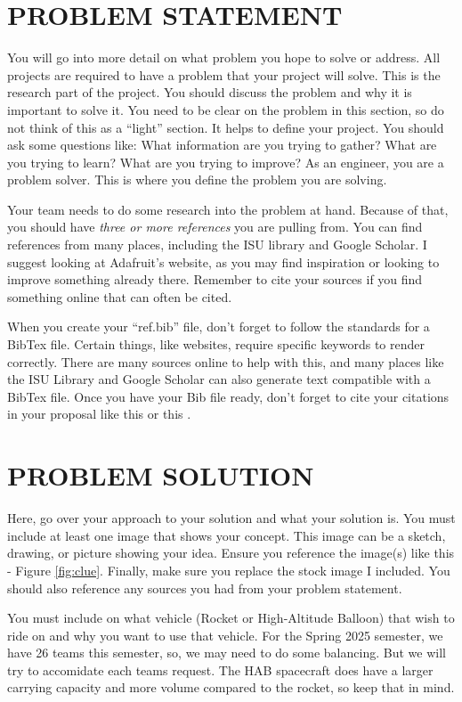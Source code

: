 \documentclass[12pt]{article}
\begin{document}
\section{PROBLEM STATEMENT}
You will go into more detail on what problem you hope to solve or address. All projects are required to have a problem that your project will solve. This is the research part of the project. You should discuss the problem and why it is important to solve it. You need to be clear on the problem in this section, so do not think of this as a ``light'' section. It helps to define your project. You should ask some questions like: What information are you trying to gather? What are you trying to learn? What are you trying to improve? As an engineer, you are a problem solver. This is where you define the problem you are solving.

Your team needs to do some research into the problem at hand. Because of that, you should have \emph{three or more references} you are pulling from. You can find references from many places, including the ISU library and Google Scholar. I suggest looking at Adafruit's website, as you may find inspiration or looking to improve something already there. Remember to cite your sources if you find something online that can often be cited.

When you create your ``ref.bib'' file, don't forget to follow the standards for a BibTex file. Certain things, like websites, require specific keywords to render correctly. There are many sources online to help with this, and many places like the ISU Library and Google Scholar can also generate text compatible with a BibTex file. Once you have your Bib file ready, don't forget to cite your citations in your proposal like this \cite{einstein} or this \cite{dirac}.

\section{PROBLEM SOLUTION}
Here, go over your approach to your solution and what your solution is. You must include at least one image that shows your concept. This image can be a sketch, drawing, or picture showing your idea. Ensure you reference the image(s) like this - Figure \ref{fig:clue}. Finally, make sure you replace the stock image I included. You should also reference any sources you had from your problem statement.

You must include on what vehicle (Rocket or High-Altitude Balloon) that wish to ride on and why you want to use that vehicle. For the Spring 2025 semester, we have 26 teams this semester, so, we may need to do some balancing. But we will try to accomidate each teams request. The HAB spacecraft does have a larger carrying capacity and more volume compared to the rocket, so keep that in mind.
\end{document}
